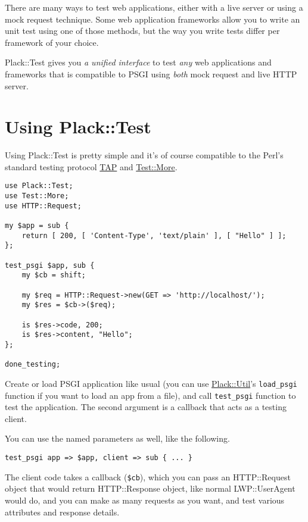 There are many ways to test web applications, either with a live server
or using a mock request technique. Some web application frameworks allow
you to write an unit test using one of those methods, but the way you
write tests differ per framework of your choice.

Plack::Test gives you \emph{a unified interface} to test \emph{any} web
applications and frameworks that is compatible to PSGI using \emph{both}
mock request and live HTTP server.

\section{Using Plack::Test}\label{using-placktest}

Using Plack::Test is pretty simple and it's of course compatible to the
Perl's standard testing protocol
\href{http://testanything.org/wiki/}{TAP} and
\href{http://search.cpan.org/perldoc?Test::More}{Test::More}.

\begin{lstlisting}
use Plack::Test;
use Test::More;
use HTTP::Request;

my $app = sub {
    return [ 200, [ 'Content-Type', 'text/plain' ], [ "Hello" ] ];
};

test_psgi $app, sub {
    my $cb = shift;
    
    my $req = HTTP::Request->new(GET => 'http://localhost/');
    my $res = $cb->($req);
    
    is $res->code, 200;
    is $res->content, "Hello";
};

done_testing;
\end{lstlisting}

Create or load PSGI application like usual (you can use
\href{http://search.cpan.org/perldoc?Plack::Util}{Plack::Util}'s
\lstinline!load_psgi! function if you want to load an app from a
 file), and call \lstinline!test_psgi! function to test
the application. The second argument is a callback that acts as a
testing client.

You can use the named parameters as well, like the following.

\begin{lstlisting}
test_psgi app => $app, client => sub { ... }
\end{lstlisting}

The client code takes a callback (\lstinline!$cb!), which you can pass
an HTTP::Request object that would return HTTP::Response object, like
normal LWP::UserAgent would do, and you can make as many requests as you
want, and test various attributes and response details.

